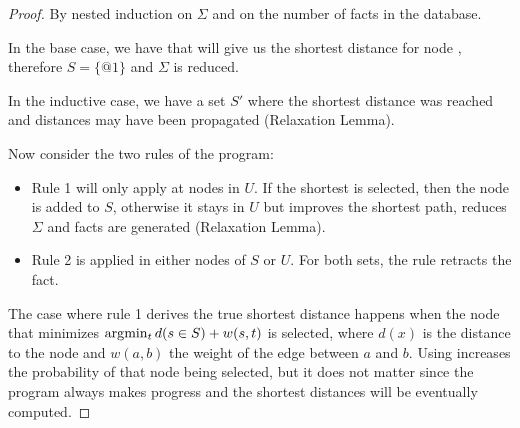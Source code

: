 \begin{proof}
   By nested induction on $\Sigma$ and on the number of facts in the database.

   In the base case, we have  that will give us
   the shortest distance for node , therefore $S = \{@1\}$ and
   $\Sigma$ is reduced.

   In the inductive case, we have a set $S'$ where the shortest distance was
   reached and  distances may have been propagated (Relaxation
   Lemma).

   Now consider the two rules of the program:

   \begin{itemize}

      \item Rule 1 will only apply at nodes in $U$. If the shortest
          is selected, then the node is added to $S$, otherwise it
         stays in $U$ but improves the shortest path, reduces $\Sigma$ and
          facts are generated (Relaxation Lemma).

      \item Rule 2 is applied in either nodes of $S$ or $U$. For both sets, the rule
         retracts the  fact.

   \end{itemize}

   The case where rule 1 derives the true shortest distance happens when the
   node that minimizes $\arg\!\min_t d(s \in S) + w(s, t)$ is selected, where
   $d(x)$ is the distance to the node  and $w(a, b)$ the weight of
   the edge between $a$ and $b$. Using  increases the
   probability of that node being selected, but it does not matter since
   the program always makes progress and the shortest distances will be
   eventually computed.
\end{proof}
